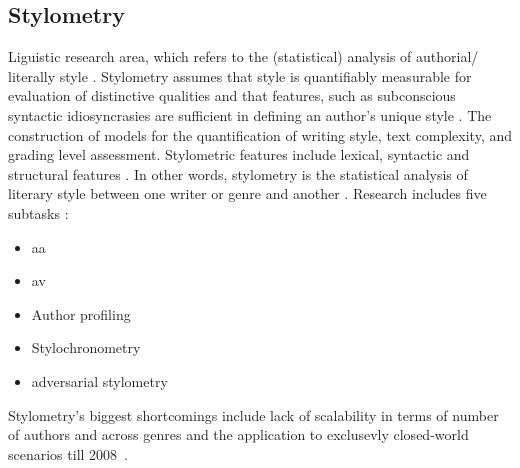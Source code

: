 \subsection{Stylometry}

\begin{definition}
    [Stylometry]
    Liguistic research area, which refers to the (statistical) analysis of authorial/ literally style \citep{elmanarelbouanani_authorship_2014,neal_surveying_2018}.
    Stylometry assumes that style is quantifiably measurable for evaluation of distinctive qualities and 
    that features, such as subconscious syntactic idiosyncrasies are sufficient in defining an author's unique style \citep{neal_surveying_2018}.
    The construction of models for the quantification of writing style, text complexity, and grading level assessment.
    Stylometric features include lexical, syntactic and structural features \citep{stein_intrinsic_2011}.
    In other words, stylometry is the statistical analysis of literary style between one writer or genre and another \citep{tyo_state_2022}.
    Research includes five subtasks \citep{neal_surveying_2018}:
    \begin{itemize}
        \item \ac{aa}
        \item \ac{av}
        \item Author profiling
        \item Stylochronometry
        \item adversarial stylometry
    \end{itemize}
\end{definition}

Stylometry's biggest shortcomings include lack of scalability in terms of number of authors and across genres and the application to exclusevly closed-world scenarios till 2008~\citep{abbasi_writeprints_2008}. 